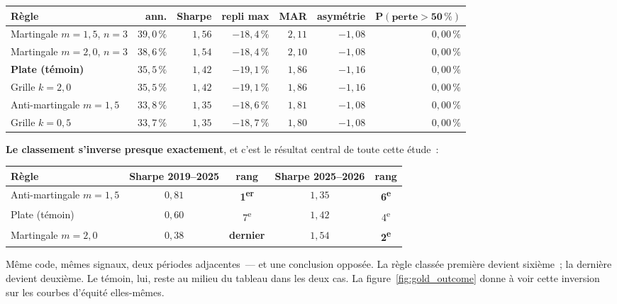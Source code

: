 \begin{center}
\renewcommand{\arraystretch}{1.25}
\small
\begin{tabular}{lrrrrrr}
\toprule
\textbf{Règle} & \textbf{ann.} & \textbf{Sharpe} & \textbf{repli max} & \textbf{MAR} & \textbf{asymétrie} & $\mathbf{P(\text{perte}>50\,\%)}$ \\
\midrule
Martingale $m{=}1{,}5$, $n{=}3$ & $39{,}0\,\%$ & $1{,}56$ & $-18{,}4\,\%$ & $2{,}11$ & $-1{,}08$ & $0{,}00\,\%$ \\
Martingale $m{=}2{,}0$, $n{=}3$ & $38{,}6\,\%$ & $1{,}54$ & $-18{,}4\,\%$ & $2{,}10$ & $-1{,}08$ & $0{,}00\,\%$ \\
\textbf{Plate (témoin)} & $35{,}5\,\%$ & $1{,}42$ & $-19{,}1\,\%$ & $1{,}86$ & $-1{,}16$ & $0{,}00\,\%$ \\
Grille $k{=}2{,}0$ & $35{,}5\,\%$ & $1{,}42$ & $-19{,}1\,\%$ & $1{,}86$ & $-1{,}16$ & $0{,}00\,\%$ \\
Anti-martingale $m{=}1{,}5$ & $33{,}8\,\%$ & $1{,}35$ & $-18{,}6\,\%$ & $1{,}81$ & $-1{,}08$ & $0{,}00\,\%$ \\
Grille $k{=}0{,}5$ & $33{,}7\,\%$ & $1{,}35$ & $-18{,}7\,\%$ & $1{,}80$ & $-1{,}08$ & $0{,}00\,\%$ \\
\bottomrule
\end{tabular}
\end{center}

\textbf{Le classement s'inverse presque exactement}, et c'est le résultat central de toute cette étude~:

\begin{center}
\renewcommand{\arraystretch}{1.3}
\small
\begin{tabular}{lcccc}
\toprule
\textbf{Règle} & \textbf{Sharpe 2019--2025} & \textbf{rang} & \textbf{Sharpe 2025--2026} & \textbf{rang} \\
\midrule
Anti-martingale $m{=}1{,}5$ & $0{,}81$ & \textbf{1\textsuperscript{er}} & $1{,}35$ & \textbf{6\textsuperscript{e}} \\
Plate (témoin) & $0{,}60$ & 7\textsuperscript{e} & $1{,}42$ & 4\textsuperscript{e} \\
Martingale $m{=}2{,}0$ & $0{,}38$ & \textbf{dernier} & $1{,}54$ & \textbf{2\textsuperscript{e}} \\
\bottomrule
\end{tabular}
\end{center}

Même code, mêmes signaux, deux périodes adjacentes~--- et une conclusion opposée. La règle classée première devient sixième~; la dernière devient deuxième. Le témoin, lui, reste au milieu du tableau dans les deux cas. La figure~\ref{fig:gold_outcome} donne à voir cette inversion sur les courbes d'équité elles-mêmes.

